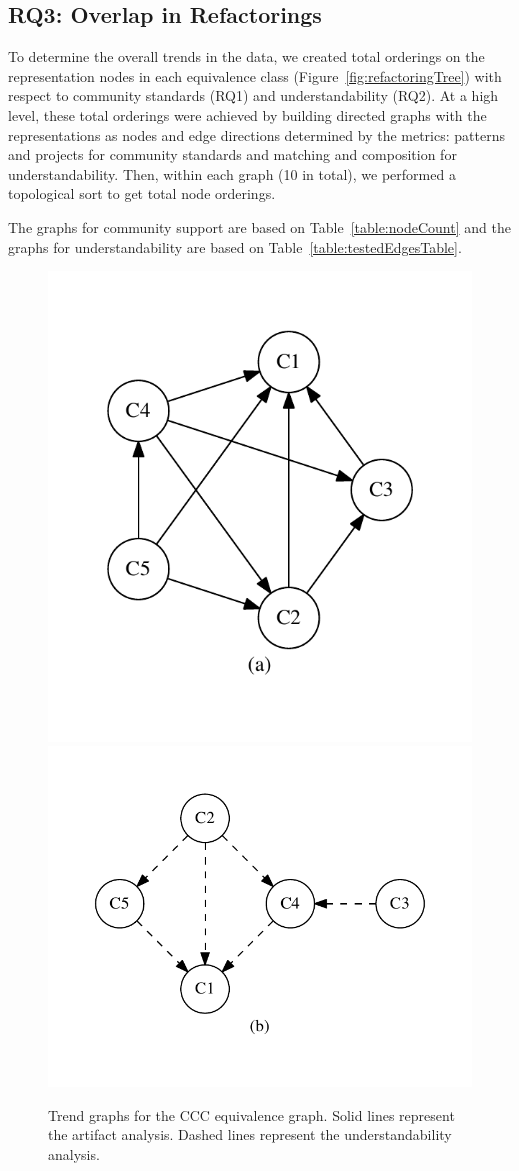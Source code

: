 \subsection{RQ3: Overlap in Refactorings}
To determine the overall trends in the data, we created total orderings on the representation nodes in each equivalence class (Figure~\ref{fig:refactoringTree})  with respect to community standards (RQ1)  and understandability (RQ2).
At a high level, these total orderings were achieved by building directed graphs with the representations as nodes and edge directions determined by the metrics: patterns and projects for community standards and matching and composition for understandability. Then, within each graph (10 in total), we performed a topological sort to get total node orderings.

The graphs for community support are based on Table~\ref{table:nodeCount} and the graphs for understandability are based on Table~\ref{table:testedEdgesTable}.

\begin{figure}[tb]
\centering
\includegraphics[width=0.42\columnwidth]{graphs/cart.pdf}\includegraphics[width=0.57\columnwidth]{graphs/ccom.pdf}
\caption{Trend graphs for the CCC equivalence graph. Solid lines represent the artifact analysis. Dashed lines represent the understandability analysis.}
\label{fig:graphsforanalysis}
\end{figure}

